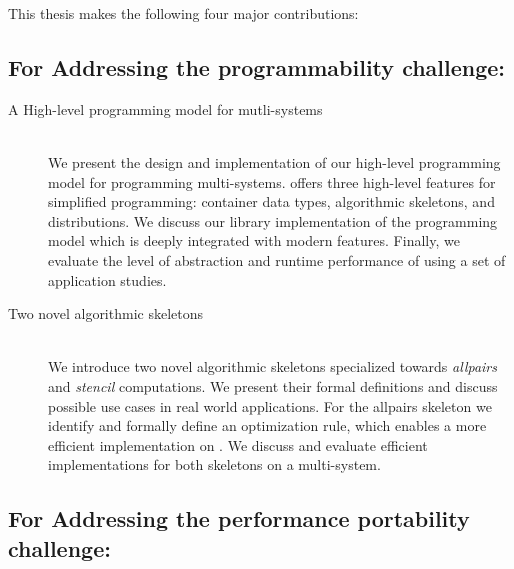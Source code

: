 This thesis makes the following four major contributions:

\subsection*{\hspace{2em}For Addressing the programmability challenge:}

\begin{description}
  \item[A High-level programming model for mutli-\GPU systems]\hfill\\[-1em]
    We present the design and implementation of our high-level programming model \SkelCL for programming multi-\GPU systems.
    \SkelCL offers three high-level features for simplified programming: container data types, algorithmic skeletons, and distributions.
    We discuss our \Cpp library implementation of the \SkelCL programming model which is deeply integrated with modern \Cpp features.
    Finally, we evaluate the level of abstraction and runtime performance of \SkelCL using a set of application studies.

  \item[Two novel algorithmic skeletons]\hfill\\[.25em]
    We introduce two novel algorithmic skeletons specialized towards \emph{allpairs} and \emph{stencil} computations.
    We present their formal definitions and discuss possible use cases in real world applications.
    For the allpairs skeleton we identify and formally define an optimization rule, which enables a more efficient implementation on \GPUs.
    We discuss and evaluate efficient implementations for both skeletons on a multi-\GPU system.
\end{description}

\subsection*{\hspace{2em}For Addressing the performance portability challenge:}

